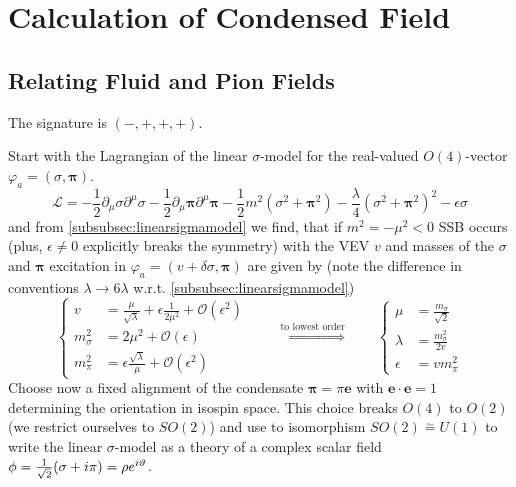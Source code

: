\chapter{Calculation of Condensed Field}

\section{Relating Fluid and Pion Fields}

The signature is $(-,+,+,+)$.

Start with the Lagrangian of the linear $\sigma$-model for the real-valued $O(4)$-vector $\varphi_a=(\sigma,\mathbf{\pi})$.
\begin{equation}
    \mathscr{L}=-\frac{1}{2}\partial_\mu\sigma\partial^\mu\sigma-\frac{1}{2}\partial_\mu\mathbf{\pi}\partial^\mu\mathbf{\pi}-\frac{1}{2}m^2(\sigma^2+\mathbf{\pi}^2)-\frac{\lambda}{4}(\sigma^2+\mathbf{\pi}^2)^2-\epsilon\sigma
\end{equation}
and from \ref{subsubsec:linearsigmamodel} we find, that if $m^2=-\mu^2<0$ SSB occurs (plus, $\epsilon\neq 0$ explicitly breaks the symmetry) with the VEV $v$ and masses of the $\sigma$ and $\mathbf{\pi}$ excitation in $\varphi_a=(v+\delta\sigma,\mathbf{\pi})$ are given by (note the difference in conventions $\lambda\to 6\lambda$ w.r.t. \ref{subsubsec:linearsigmamodel})
\begin{equation}
    \left\{
    \begin{split}
        v          & =\frac{\mu}{\sqrt{\lambda}}+\epsilon\frac{1}{2\mu^2}+\mathcal{O}(\epsilon^2) \\
        m_\sigma^2 & =2\mu^2+\mathcal{O}(\epsilon)                                                \\
        m_\pi^2    & =\epsilon\frac{\sqrt{\lambda}}{\mu}+\mathcal{O}(\epsilon^2)
    \end{split}
    \right.\qquad\overset{\text{to lowest order}}{\iff}\qquad
    \left\{
    \begin{split}
        \mu&=\frac{m_\sigma}{\sqrt{2}}\\
        \lambda&=\frac{m_\sigma^2}{2v}\\
        \epsilon&=vm_\pi^2
    \end{split}
    \right.
    \label{eq:LinearSigmaModel_CouplingsMassesRelation}
\end{equation}
Choose now a fixed alignment of the condensate $\mathbf{\pi}=\pi\mathbf{e}$ with $\mathbf{e}\cdot\mathbf{e}=1$ determining the orientation in isospin space. This choice breaks $O(4)$ to $O(2)$ (we restrict ourselves to $SO(2)$) and use to isomorphism $SO(2)\overset{\sim}{=}U(1)$ to write the linear $\sigma$-model as a theory of a complex scalar field $\phi=\frac{1}{\sqrt{2}}(\sigma+{i}\pi)=\rho e^{{i}\vartheta}$.
